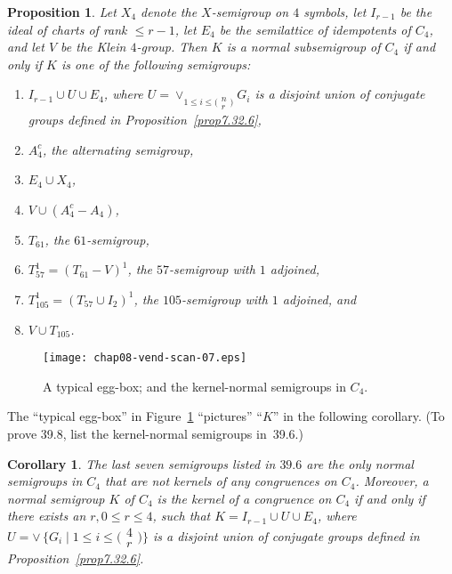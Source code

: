 \documentclass{surv-l}
\numberwithin{equation}{section}
\numberwithin{table}{section}
\numberwithin{figure}{section}
\newtheorem{corollary}[equation]{Corollary}
\newtheorem{proposition}[equation]{Proposition}
\theoremstyle{definition}
\begin{document}
\setcounter{equation}{5}
\begin{proposition}\label{prop8.39.6}
Let $X_{4}$ denote the $X$-semigroup on
$4$ symbols, let $I_{r-1}$ be the ideal of
charts of rank $\leq r-1$, let $E_{4}$ be the semilattice of
idempotents of $C_{4}$, and let $V$ be the Klein $4$-group. Then $K$
is a normal subsemigroup of $C_{4}$ if and only if $K$ is one of
the following semigroups:
\begin{enumerate}
\item[(1)] $I_{r-1}\cup U\cup E_{4}$, where $U=\vee_{1\leq
i\leq\big(\!\begin{smallmatrix}{n}\\
{r}\end{smallmatrix}\!\big)}G_{i}$ is a disjoint union of
conjugate groups defined in \emph{Proposition~\ref{prop7.32.6}},

\item[(2)] $A_{4}^{c}$, the alternating semigroup,

\item[(3)] $E_{4}\cup X_{4}$,

\item[(4)] $V\cup(A_{4}^{c}-A_{4})$,

\item[(5)] $T_{61}$, the $61$-semigroup,

\item[(6)] $T_{57}^{1}=(T_{61}-V)^{1}$, the $57$-semigroup with $1$ adjoined,

\item[(7)] $T_{105}^{1}=(T_{57}\cup I_{2})^{1}$, the $105$-semigroup with $1$ adjoined, and

\item[(8)] $V\cup T_{105}$.
\end{enumerate}
\end{proposition}

\setcounter{figure}{6}
\begin{figure}[!h]
\texttt{[image: chap08-vend-scan-07.eps]}
\caption{A typical egg-box; and the kernel-normal semigroups in $C_{4}$.\label{fig8.39.7}}
\end{figure}


The ``typical egg-box'' in Figure~\ref{fig8.39.7} ``pictures''
``$K$'' in the following corollary. (To prove 39.8, list the
kernel-normal semigroups in~39.6.)

\setcounter{equation}{7}
\begin{corollary}\label{cor8.39.8}
The last seven semigroups listed in $39.6$ are the only normal
semigroups in $C_{4}$ that
are not kernels of any congruences on $C_{4}$. Moreover, a normal
semigroup $K$ of $C_{4}$ is the kernel of a congruence on $C_{4}$
if and only if there exists an $r, 0\leq r\leq 4$, such that
$K=I_{r-1}\cup U\cup E_{4}$, where $U=\vee\,\{G_{i}\mid 1 \leq
i\leq\big(\!\begin{smallmatrix}
4\\
r \end{smallmatrix}\!\big)\}$ is a disjoint union of conjugate
groups defined in \emph{Proposition~\ref{prop7.32.6}}.
\end{corollary}
\end{document}

